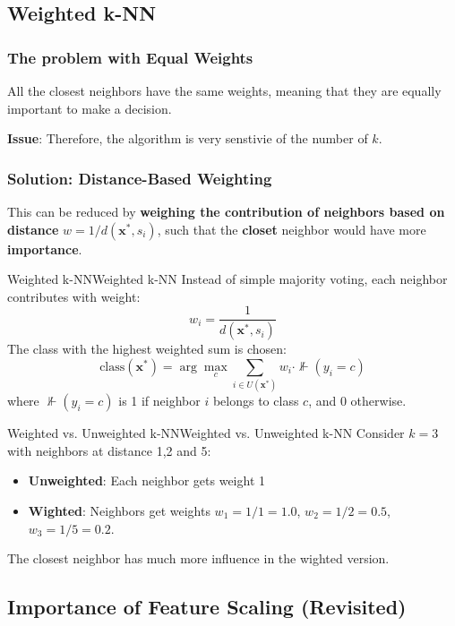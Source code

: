 \documentclass[a4paper]{article}
\theoremstyle{definition}
\begin{document}
\subsection{Weighted k-NN}
\subsubsection{The problem with Equal Weights}
All the closest neighbors have the same weights, meaning that they are equally important to make a decision.
\begin{tcolorbox}[
    colback=magenta!15!white,
    colframe=magenta!15!white,
    boxrule=0pt,
    arc=0pt,
    halign=center
]
    \textbf{Issue}: Therefore, the algorithm is very senstivie of the number of \( k \).
\end{tcolorbox}
\subsubsection{Solution: Distance-Based Weighting}
This can be reduced by \textbf{weighing the contribution of neighbors based on distance} \( w = 1/d(\mathbf{x}^*,s_i) \),
such that the \textbf{closet} neighbor would have more \textbf{importance}.
\begin{definition}{Weighted k-NN}{Weighted k-NN}
Instead of simple majority voting, each neighbor contributes with weight:
\[
  w_i = \frac{1}{d(\mathbf{x}^*,s_i)}
\]
The class with the highest weighted sum is chosen:
\[
  \text{class}(\mathbf{x}^*) = \arg\max_{c} \sum_{i \in U(\mathbf{x}^*)} w_i \cdot \nVdash (y_i = c)
\]
where \( \nVdash (y_i = c) \) is 1 if neighbor \( i \) belongs to class \( c \), and 0 otherwise.
\end{definition}
\begin{example}{Weighted vs. Unweighted k-NN}{Weighted vs. Unweighted k-NN}
Consider \( k = 3 \) with neighbors at distance 1,2 and 5:
\begin{itemize}
    \item \textbf{Unweighted}: Each neighbor gets weight 1 
    \item \textbf{Wighted}: Neighbors get weights \( w_1 = 1/1 = 1.0 \), \( w_2 = 1/2 = 0.5 \), \( w_3 = 1/5 = 0.2 \).
\end{itemize}
The closest neighbor has much more influence in the wighted version.
\end{example}
\subsection{Importance of Feature Scaling (Revisited)}
\end{document}
